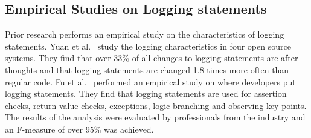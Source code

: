 %
%






\subsection{Empirical Studies on Logging statements}


Prior research performs an empirical study on the characteristics of logging statements. Yuan et al.~\cite{Characterizinglogs} study the logging characteristics in four open source systems. They find that over 33\% of all changes to logging statements are after-thoughts and that logging statements are changed 1.8 times more often than regular code. Fu {et al$.$}~\cite{Fu1} performed an empirical study on where developers put logging statements. They find that logging statements are used for assertion checks, return value checks, exceptions, logic-branching and observing key points. The results of the analysis were evaluated by professionals from the industry and an F-measure of over 95\% was achieved. 


